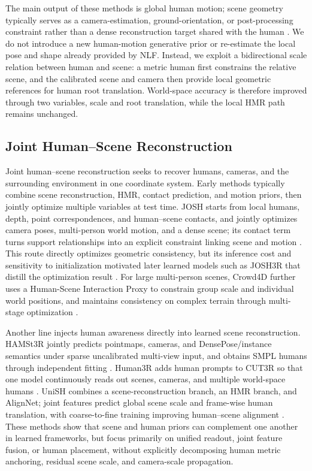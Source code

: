 \documentclass{article}
\begin{document}
The main output of these methods is global human motion; scene geometry typically serves as a camera-estimation, ground-orientation, or post-processing constraint rather than a dense reconstruction target shared with the human \citep{yuan2022glamr,wang2024tram,shin2024wham,shen2024gvhmr,wang2026duomo}. We do not introduce a new human-motion generative prior or re-estimate the local pose and shape already provided by NLF. Instead, we exploit a bidirectional scale relation between human and scene: a metric human first constrains the relative scene, and the calibrated scene and camera then provide local geometric references for human root translation. World-space accuracy is therefore improved through two variables, scale and root translation, while the local HMR path remains unchanged.

\subsection{Joint Human--Scene Reconstruction}

Joint human--scene reconstruction seeks to recover humans, cameras, and the surrounding environment in one coordinate system. Early methods typically combine scene reconstruction, HMR, contact prediction, and motion priors, then jointly optimize multiple variables at test time. JOSH starts from local humans, depth, point correspondences, and human--scene contacts, and jointly optimizes camera poses, multi-person world motion, and a dense scene; its contact term turns support relationships into an explicit constraint linking scene and motion \citep{liu2026josh}. This route directly optimizes geometric consistency, but its inference cost and sensitivity to initialization motivated later learned models such as JOSH3R that distill the optimization result \citep{liu2026josh}. For large multi-person scenes, Crowd4D further uses a Human-Scene Interaction Proxy to constrain group scale and individual world positions, and maintains consistency on complex terrain through multi-stage optimization \citep{kang2026crowd4d}.

Another line injects human awareness directly into learned scene reconstruction. HAMSt3R jointly predicts pointmaps, cameras, and DensePose/instance semantics under sparse uncalibrated multi-view input, and obtains SMPL humans through independent fitting \citep{rojas2025hamst3r}. Human3R adds human prompts to CUT3R so that one model continuously reads out scenes, cameras, and multiple world-space humans \citep{chen2026human3r}. UniSH combines a scene-reconstruction branch, an HMR branch, and AlignNet; joint features predict global scene scale and frame-wise human translation, with coarse-to-fine training improving human--scene alignment \citep{li2026unish}. These methods show that scene and human priors can complement one another in learned frameworks, but focus primarily on unified readout, joint feature fusion, or human placement, without explicitly decomposing human metric anchoring, residual scene scale, and camera-scale propagation.
\end{document}
